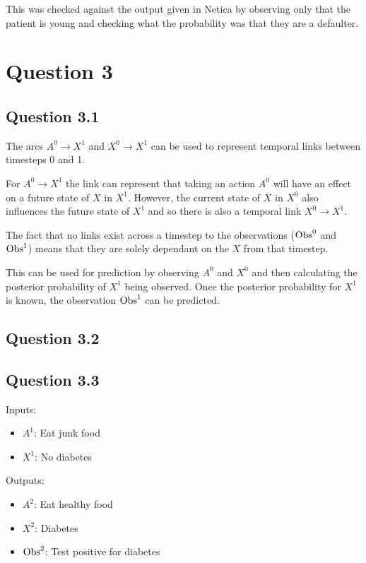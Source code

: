 \documentclass[12pt,notitlepage]{article}
\newcommand{\question}{\section*}
\begin{document}
This was checked against the output given in Netica by observing only that the
patient is young and checking what the probability was that they are a
defaulter.

\question{Question 3}

\subsection*{Question 3.1}

The arcs $A^0 \to X^1$ and $X^0 \to X^1$ can be used to represent
temporal links between timesteps 0 and 1.

For $A^0 \to X^1$ the link can represent that taking an action $A^0$ will have
an effect on a future state of $X$ in $X^1$. However, the current state of $X$
in $X^0$ also influences the future state of $X^1$ and so there is also a
temporal link $X^0 \to X^1$.

The fact that no links exist across a timestep to the observations
($\textnormal{Obs}^0$ and $\textnormal{Obs}^1$) means that they are solely
dependant on the $X$ from that timestep.

This can be used for prediction by observing $A^0$ and $X^0$ and then
calculating the posterior probability of $X^1$ being observed. Once the
posterior probability for $X^1$ is known, the observation $\textnormal{Obs}^1$
can be predicted.

\subsection*{Question 3.2}


\subsection*{Question 3.3}

Inputs:

\begin{itemize}
    \item $A^1$: Eat junk food
    \item $X^1$: No diabetes
\end{itemize}

Outputs:

\begin{itemize}
    \item $A^2$: Eat healthy food
    \item $X^2$: Diabetes
    \item $\textnormal{Obs}^2$: Test positive for diabetes
\end{itemize}
\end{document}
